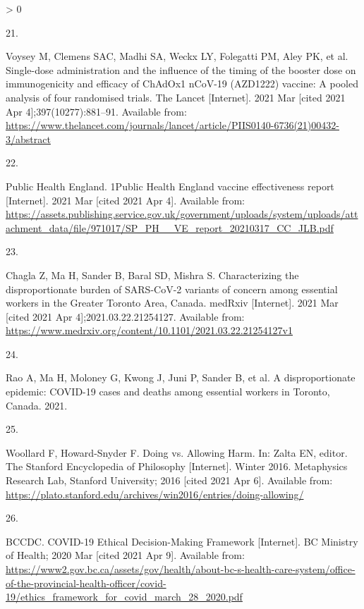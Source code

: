 \documentclass[]{elsarticle} %
\newlength{\csllabelwidth}
\newlength{\cslhangindent}
\newenvironment{CSLReferences}[3] %
 {%
  \setlength{\parindent}{0pt}
  \ifodd #1 \everypar{\setlength{\hangindent}{\cslhangindent}}\ignorespaces\fi
  \ifnum #2 > 0
  \setlength{\parskip}{#2\baselineskip}
  \fi
 }%
 {}
\newcommand{\CSLLeftMargin}[1]{\parbox[t]{\csllabelwidth}{#1}}
\newcommand{\CSLRightInline}[1]{\parbox[t]{\linewidth - \csllabelwidth}{#1}}
\begin{document}
\begin{CSLReferences}{0}{0}
\leavevmode\hypertarget{ref-voysey_single-dose_2021}{}%
\CSLLeftMargin{21. }
\CSLRightInline{Voysey M, Clemens SAC, Madhi SA, Weckx LY, Folegatti PM,
Aley PK, et al. Single-dose administration and the influence of the
timing of the booster dose on immunogenicity and efficacy of {ChAdOx1}
{nCoV}-19 ({AZD1222}) vaccine: A pooled analysis of four randomised
trials. The Lancet {[}Internet{]}. 2021 Mar {[}cited 2021 Apr
4{]};397(10277):881--91. Available from:
\url{https://www.thelancet.com/journals/lancet/article/PIIS0140-6736(21)00432-3/abstract}}

\leavevmode\hypertarget{ref-public_health_england_1public_2021}{}%
\CSLLeftMargin{22. }
\CSLRightInline{Public Health England. {1Public} {Health} {England}
vaccine effectiveness report {[}Internet{]}. 2021 Mar {[}cited 2021 Apr
4{]}. Available from:
\url{https://assets.publishing.service.gov.uk/government/uploads/system/uploads/attachment_data/file/971017/SP_PH__VE_report_20210317_CC_JLB.pdf}}

\leavevmode\hypertarget{ref-chagla_characterizing_2021}{}%
\CSLLeftMargin{23. }
\CSLRightInline{Chagla Z, Ma H, Sander B, Baral SD, Mishra S.
Characterizing the disproportionate burden of {SARS}-{CoV}-2 variants of
concern among essential workers in the {Greater} {Toronto} {Area},
{Canada}. medRxiv {[}Internet{]}. 2021 Mar {[}cited 2021 Apr
4{]};2021.03.22.21254127. Available from:
\url{https://www.medrxiv.org/content/10.1101/2021.03.22.21254127v1}}

\leavevmode\hypertarget{ref-rao_disproportionate_2021}{}%
\CSLLeftMargin{24. }
\CSLRightInline{Rao A, Ma H, Moloney G, Kwong J, Juni P, Sander B, et
al. A disproportionate epidemic: {COVID}-19 cases and deaths among
essential workers in {Toronto}, {Canada}. 2021. }

\leavevmode\hypertarget{ref-woollard_doing_2016}{}%
\CSLLeftMargin{25. }
\CSLRightInline{Woollard F, Howard-Snyder F. Doing vs. {Allowing}
{Harm}. In: Zalta EN, editor. The {Stanford} {Encyclopedia} of
{Philosophy} {[}Internet{]}. Winter 2016. Metaphysics Research Lab,
Stanford University; 2016 {[}cited 2021 Apr 6{]}. Available from:
\url{https://plato.stanford.edu/archives/win2016/entries/doing-allowing/}}

\leavevmode\hypertarget{ref-bccdc_covid-19_2020}{}%
\CSLLeftMargin{26. }
\CSLRightInline{BCCDC. {COVID}-19 {Ethical} {Decision}-{Making}
{Framework} {[}Internet{]}. BC Ministry of Health; 2020 Mar {[}cited
2021 Apr 9{]}. Available from:
\url{https://www2.gov.bc.ca/assets/gov/health/about-bc-s-health-care-system/office-of-the-provincial-health-officer/covid-19/ethics_framework_for_covid_march_28_2020.pdf}}


\end{CSLReferences}
\end{document}
